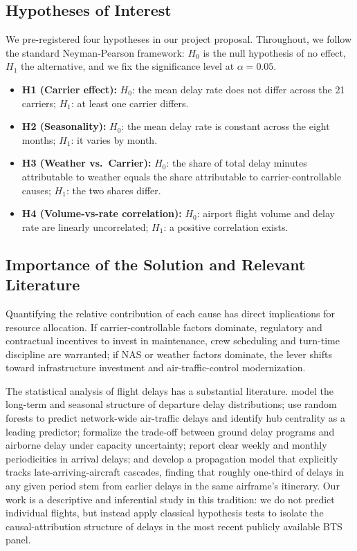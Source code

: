 \documentclass[12pt,letterpaper]{article}
\begin{document}
\subsection{Hypotheses of Interest}
We pre-registered four hypotheses in our project proposal. Throughout,
we follow the standard Neyman-Pearson framework: $H_0$ is the null
hypothesis of no effect, $H_1$ the alternative, and we fix the
significance level at $\alpha = 0.05$.
\begin{itemize}[leftmargin=2.0em, itemsep=2pt, topsep=2pt]
  \item \textbf{H1 (Carrier effect):} $H_0$: the mean delay rate does
  not differ across the 21 carriers; $H_1$: at least one carrier differs.
  \item \textbf{H2 (Seasonality):} $H_0$: the mean delay rate is constant
  across the eight months; $H_1$: it varies by month.
  \item \textbf{H3 (Weather vs.\ Carrier):} $H_0$: the share of total
  delay minutes attributable to weather equals the share attributable to
  carrier-controllable causes; $H_1$: the two shares differ.
  \item \textbf{H4 (Volume-vs-rate correlation):} $H_0$: airport flight
  volume and delay rate are linearly uncorrelated; $H_1$: a positive
  correlation exists.
\end{itemize}

\subsection{Importance of the Solution and Relevant Literature}
Quantifying the relative contribution of each cause has direct
implications for resource allocation. If carrier-controllable factors
dominate, regulatory and contractual incentives to invest in
maintenance, crew scheduling and turn-time discipline are warranted; if
NAS or weather factors dominate, the lever shifts toward infrastructure
investment and air-traffic-control modernization.

The statistical analysis of flight delays has a substantial literature.
\citet{tu2008} model the long-term and seasonal structure of departure
delay distributions; \citet{rebollo2014} use random forests to predict
network-wide air-traffic delays and identify hub centrality as a leading
predictor; \citet{mukherjee2014} formalize the trade-off between ground
delay programs and airborne delay under capacity uncertainty;
\citet{abdelghany2004} report clear weekly and monthly periodicities in
arrival delays; and \citet{kafle2017} develop a propagation model that
explicitly tracks late-arriving-aircraft cascades, finding that roughly
one-third of delays in any given period stem from earlier delays in the
same airframe's itinerary. Our work is a descriptive and inferential
study in this tradition: we do not predict individual flights, but
instead apply classical hypothesis tests to isolate the
causal-attribution structure of delays in the most recent publicly
available BTS panel.
\end{document}

